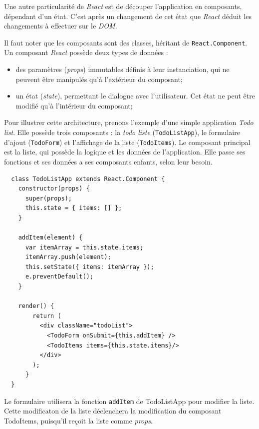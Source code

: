 \documentclass[12pt,a4paper]{article}
\providecommand{\tightlist}{%
  \setlength{\itemsep}{0pt}\setlength{\parskip}{0pt}}
\begin{document}
  \bigskip

  Une autre particularité de \emph{React} est de découper l'application en
  composants, dépendant d'un état. C'est après un changement de cet état
  que \emph{React} déduit les changements à effectuer sur le \emph{DOM}.

  \bigskip

  Il faut noter que les composants sont des classes, héritant de
  \texttt{React.Component}. Un composant \emph{React} possède deux types
  de données :

  \begin{itemize}
  \tightlist
  \item
    des paramètres (\emph{props}) immutables définis à leur instanciation,
    qui ne peuvent être manipulés qu'à l'extérieur du composant;
  \item
    un état (\emph{state}), permettant le dialogue avec l'utilisateur. Cet
    état ne peut être modifié qu'à l'intérieur du composant;
  \end{itemize}

  \bigskip

  Pour illustrer cette architecture, prenons l'exemple d'une simple
  application \emph{Todo list}. Elle possède trois composants : la
  \emph{todo liste} (\texttt{TodoListApp}), le formulaire d'ajout
  (\texttt{TodoForm}) et l'affichage de la liste (\texttt{TodoItems}). Le
  composant principal est la liste, qui possède la logique et les données
  de l'application. Elle passe ses fonctions et ses données a ses
  composants enfants, selon leur besoin.

  \begin{verbatim}
  class TodoListApp extends React.Component {
    constructor(props) {
      super(props);
      this.state = { items: [] };
    }

    addItem(element) {
      var itemArray = this.state.items;
      itemArray.push(element);
      this.setState({ items: itemArray });
      e.preventDefault();
    }

    render() {
        return (
          <div className="todoList">
            <TodoForm onSubmit={this.addItem} />
            <TodoItems items={this.state.items}/>
          </div>
        );
      }
  }
  \end{verbatim}

  Le formulaire utilisera la fonction \texttt{addItem} de TodoListApp pour
  modifier la liste. Cette modificaton de la liste déclenchera la
  modification du composant TodoItems, puisqu'il reçoit la liste comme
  \emph{props}.
\end{document}
